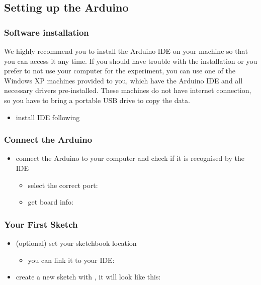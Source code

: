 \subsection{Setting up the Arduino}\label{sec:setup}
\subsubsection{Software installation}
We highly recommend you to install the Arduino \ac{IDE} on your machine so that you can access it any time. If you should have trouble with the installation or you prefer to not use your computer for the experiment, you can use one of the Windows XP machines provided to you, which have the Arduino IDE and all necessary drivers pre-installed. These machines do not have internet connection, so you have to bring a portable USB drive to copy the data.
\begin{itemize}
	\item install \ac{IDE} following 
\end{itemize}

\subsubsection{Connect the Arduino}
\begin{itemize}
	\item connect the Arduino to your computer and check if it is recognised by the \ac{IDE}
	\begin{itemize}
		\item select the correct port: 
		\item get board info: 
	\end{itemize}
\end{itemize}

\subsubsection{Your First Sketch}
\begin{itemize}
	\item (optional) set your sketchbook location
	\begin{itemize}
		\item you can link it to your \ac{IDE}: 
	\end{itemize}
	\item create a new sketch with , it will look like this:
\end{itemize}


